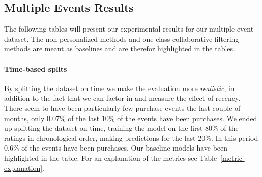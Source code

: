 \subsection{Multiple Events Results}

The following tables will present our experimental results for our multiple event dataset.
The non-personalized methods and one-class collaborative filtering methods are meant as baselines
and are therefor highlighted in the tables.

\paragraph{Time-based splits}

By splitting the dataset on time we make the evaluation more \textit{realistic}, in addition to the fact that we can factor in and measure the effect of recency.
There seem to have been particularly few purchase events the last couple of months, only 0.07\% of the last 10\% of the events have been purchases. We ended up
splitting the dataset on time, training the model on the first 80\% of the ratings in chronological order, making predictions for the last 20\%. In this period
0.6\% of the events have been purchases. Our baseline models have been highlighted in the table. For an explanation of the metrics see Table~\ref{metric-explanation}.


